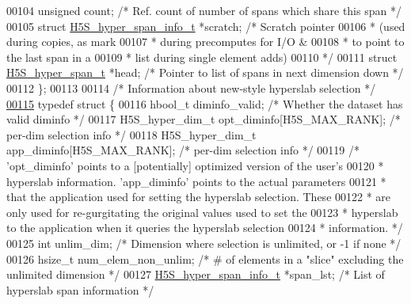 \begin{DoxyCode}
00104     \textcolor{keywordtype}{unsigned} count;                    \textcolor{comment}{/* Ref. count of number of spans which share this span */}
00105     \textcolor{keyword}{struct }\hyperlink{struct_h5_s__hyper__span__info__t}{H5S\_hyper\_span\_info\_t} *scratch;  \textcolor{comment}{/* Scratch pointer}
00106 \textcolor{comment}{                                             * (used during copies, as mark}
00107 \textcolor{comment}{                                             * during precomputes for I/O &}
00108 \textcolor{comment}{                                             * to point to the last span in a}
00109 \textcolor{comment}{                                             * list during single element adds)}
00110 \textcolor{comment}{                                             */}
00111     \textcolor{keyword}{struct }\hyperlink{struct_h5_s__hyper__span__t}{H5S\_hyper\_span\_t} *head;  \textcolor{comment}{/* Pointer to list of spans in next dimension down */}
00112 \};
00113 
00114 \textcolor{comment}{/* Information about new-style hyperslab selection */}
\hyperlink{struct_h5_s__hyper__sel__t}{00115} \textcolor{keyword}{typedef} \textcolor{keyword}{struct }\{
00116     hbool\_t diminfo\_valid;                      \textcolor{comment}{/* Whether the dataset has valid diminfo */}
00117     H5S\_hyper\_dim\_t opt\_diminfo[H5S\_MAX\_RANK];  \textcolor{comment}{/* per-dim selection info */}
00118     H5S\_hyper\_dim\_t app\_diminfo[H5S\_MAX\_RANK];  \textcolor{comment}{/* per-dim selection info */}
00119     \textcolor{comment}{/* 'opt\_diminfo' points to a [potentially] optimized version of the user's}
00120 \textcolor{comment}{         * hyperslab information.  'app\_diminfo' points to the actual parameters}
00121 \textcolor{comment}{         * that the application used for setting the hyperslab selection.  These}
00122 \textcolor{comment}{         * are only used for re-gurgitating the original values used to set the}
00123 \textcolor{comment}{         * hyperslab to the application when it queries the hyperslab selection}
00124 \textcolor{comment}{         * information. */}
00125     \textcolor{keywordtype}{int} unlim\_dim;                              \textcolor{comment}{/* Dimension where selection is unlimited, or -1 if none */}
00126     hsize\_t num\_elem\_non\_unlim;                 \textcolor{comment}{/* # of elements in a "slice" excluding the unlimited
       dimension */}
00127     \hyperlink{struct_h5_s__hyper__span__info__t}{H5S\_hyper\_span\_info\_t} *span\_lst; \textcolor{comment}{/* List of hyperslab span information */}

\end{DoxyCode}
